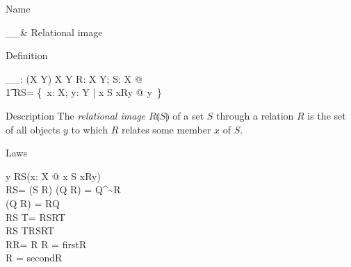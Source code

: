 \begin{manpage}\label{p:1070}
\item[Name]
\begin{name}
        \_\limg\_\rimg & Relational image%
		\symdex{$\_\limg\_\rimg$}
\end{name}

\item[Definition]
\begin{gendef}[X,Y]
        \_\limg\_\rimg: (X \rel Y) \cross \power X \fun \power Y
\where
        \forall R: X \rel Y; S: \power X @ \\
\t1         R\limg S\rimg = \{~x: X; y: Y | x \in S \land %
                                        \reln xRy @ y~\}
\end{gendef}

\item[Description]
The {\em relational image\/} $R\limg S\rimg$ of a set $S$ through
a relation $R$ is the set of all objects $y$ to which $R$ relates
some member $x$ of $S$.

\item[Laws]
\begin{laws}
        y \in R\limg S\rimg \iff (\exists x: X @ %
                                        x \in S \land \reln xRy) \\
        R\limg S\rimg = \ran (S \dres R)
\also
        \dom (Q \comp R) = Q^\sim\limg \dom R\rimg \\
        \ran (Q \comp R) = R\limg \ran Q\rimg \\
        R\limg S \cup T\rimg = R\limg S\rimg \cup R\limg T\rimg \\
        R\limg S \cap T\rimg \subseteq R\limg S\rimg \cap R\limg T\rimg \\
        R\limg \dom R\rimg = \ran R
\also
	\dom R = first\limg R\rimg \\
	\ran R = second\limg R\rimg
\end{laws}
\end{manpage}
